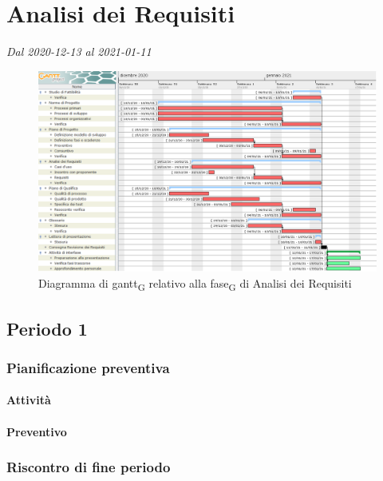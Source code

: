 \section{Analisi dei Requisiti}
\textit{Dal 2020-12-13 al 2021-01-11}


\begin{figure}[H]
	\centering
	\includegraphics[scale=0.45]{res/images/02_gantt_analisi_requisiti.png}
	\caption{Diagramma di gantt\textsubscript{G} relativo alla fase\textsubscript{G} di Analisi dei Requisiti}
\end{figure}


\subsection{Periodo 1}

\subsubsection{Pianificazione preventiva}

\paragraph{Attività}

\planningTable{
	
}


\paragraph{Preventivo}



\subsubsection{Riscontro di fine periodo}


